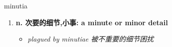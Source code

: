 
\begin{frame}
{\huge minutia}
\begin{center}
\begin{enumerate}\Large
  \item \textbf{n. 次要的细节,小事: a minute or minor detail}
  \begin{itemize}
    \item \em{\Large{plagued by minutiae 被不重要的细节困扰}}
  \end{itemize}
\end{enumerate}
\end{center}
\end{frame}
